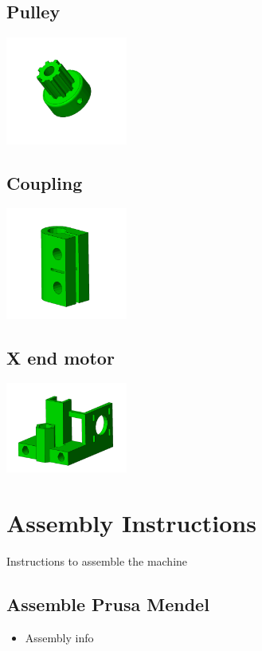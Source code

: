 \documentclass[11pt]{article}
\begin{document}
\subsection{Pulley}


\includegraphics[width=4cm]{images/pulley.jpg}
\subsection{Coupling}


\includegraphics[width=4cm]{images/coupling.jpg}
\subsection{X end motor}


\includegraphics[width=4cm]{images/x-end-motor.jpg}
\newpage
\section{Assembly Instructions}
Instructions to assemble the machine
\subsection{Assemble Prusa Mendel}
\begin{itemize}
\item Assembly info
\end{itemize}
\end{document}
